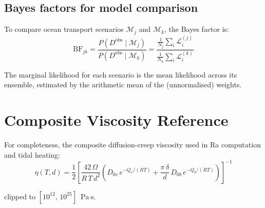 \documentclass[11pt,a4paper]{article}
\begin{document}
\subsection{Bayes factors for model comparison}

To compare ocean transport scenarios $\mathcal{M}_j$ and
$\mathcal{M}_k$, the Bayes factor is:
\begin{equation}
\mathrm{BF}_{jk}
  = \frac{P(D^{\mathrm{obs}} \mid \mathcal{M}_j)}
         {P(D^{\mathrm{obs}} \mid \mathcal{M}_k)}
  = \frac{\frac{1}{N_j}\sum_i \mathcal{L}_i^{(j)}}
         {\frac{1}{N_k}\sum_i \mathcal{L}_i^{(k)}}
\end{equation}

The marginal likelihood for each scenario is the mean likelihood
across its ensemble, estimated by the arithmetic mean of the
(unnormalised) weights.

\section{Composite Viscosity Reference}
\label{sec:visc_ref}

For completeness, the composite diffusion-creep viscosity used in
Ra computation and tidal heating:
\begin{equation}
\eta(T, d) = \frac{1}{2}\left[
  \frac{42\,\Omega}{R\,T\,d^2}
  \left(
    D_{0v}\,e^{-Q_v/(RT)}
    + \frac{\pi\,\delta}{d}\,D_{0b}\,e^{-Q_b/(RT)}
  \right)
\right]^{-1}
\label{eq:viscosity_repeat}
\end{equation}

clipped to $[10^{12},\, 10^{25}]$~Pa$\cdot$s.
\end{document}

